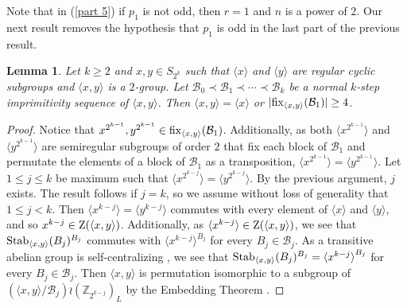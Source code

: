 \documentclass{amsart}
\newtheorem{lem}[thrm]{Lemma}
\theoremstyle{definition}
\theoremstyle{remark}
\numberwithin{equation}{section}
\def\Z{{\mathbb Z}}
\def\la{{\langle}}
\def\ra{{\rangle}}
\def\fix{{\rm fix}}
\def\Stab{{\rm Stab}}
\def\cal{\mathcal}
\def\C{{\rm Z}}
\begin{document}
Note that in (\ref{part 5}) if $p_1$ is not odd, then $r = 1$ and $n$ is a power of $2$.  Our next result removes the hypothesis that $p_1$ is odd in the last part of the previous result.

\begin{lem}\label{pimpernel found}
Let $k\ge 2$ and $x,y\in S_{2^k}$ such that $\la x\ra$ and  $\la y\ra$ are regular cyclic subgroups and $\la x,y\ra$ is a $2$-group.  Let ${\cal B}_0\prec{\cal B}_1\prec\cdots\prec{\cal B}_k$ be a normal $k$-step imprimitivity sequence of $\la x,y\ra$.  Then $\la x,y\ra = \la x\ra$ or $\vert \fix_{\la x,y\ra}({\cal B}_1)\vert \ge 4$.
\end{lem}

\begin{proof}
Notice that $x^{2^{k-1}}, y^{2^{k-1}}\in\fix_{\la x,y\ra}({\cal B}_1)$.  Additionally, as both $\la x^{2^{k-1}}\ra$ and $\la y^{2^{k-1}}\ra$ are semiregular subgroups of order $2$ that fix each block of ${\cal B}_1$ and permutate the elements of a block of ${\cal B}_1$ as a transposition, $\la x^{2^{k-1}}\ra = \la y^{2^{k-1}}\ra$.  Let $1\le j\le k$ be maximum such that $\la x^{2^{k-j}}\ra = \la y^{2^{k-j}}\ra$.  By the previous argument, $j$ exists.  The result follows if $j = k$, so we assume without loss of generality that $1 \le j < k$.  Then $\la x^{k-j}\ra = \la y^{k-j}\ra$ commutes with every element of $\la x\ra$ and $\la y\ra$, and so $x^{k-j}\in \C(\la x,y\ra)$.  Additionally, as $\la x^{k-j}\ra\in \C(\la x,y\ra)$, we see that $\Stab_{\la x,y\ra}(B_j)^{B_j}$ commutes with $\la x^{k-j}\ra^{B_j}$ for every $B_j\in{\cal B}_j$.  As a transitive abelian group is self-centralizing \cite[Corollary 2.2.18]{Book}, we see that $\Stab_{\la x,y\ra}(B_j)^{B_j} = \la x^{k-j}\ra^{B_j}$ for every $B_j\in{\cal B}_j$.   Then $\la x,y\ra$ is permutation isomorphic to a subgroup of $(\la x,y\ra/{\cal B}_j)\wr(\Z_{2^{k-j}})_L$ by the Embedding Theorem \cite[Theorem 4.3.1]{Book}.


\end{proof}
\end{document}

